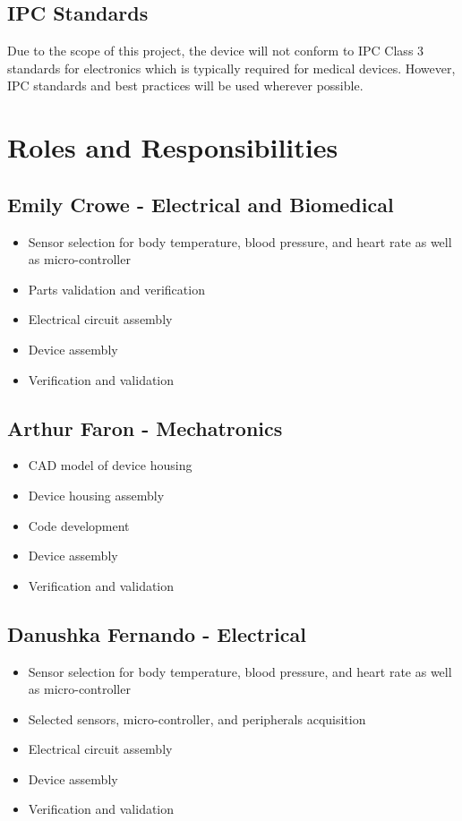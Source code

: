 \documentclass{article}
\begin{document}
    \subsection{IPC Standards}
    Due to the scope of this project, the device will not conform to IPC Class 3 standards for electronics which is typically required for medical devices.  However, IPC standards and best practices will be used wherever possible.  
    
    
    \newpage
    
    \section{Roles and Responsibilities}
        \subsection{Emily Crowe - Electrical and Biomedical}
            \begin{itemize}
                \item Sensor selection for body temperature, blood pressure, and heart rate as well as micro-controller
                \item Parts validation and verification
                \item Electrical circuit assembly
                \item Device assembly
                \item Verification and validation
            \end{itemize}
        \subsection{Arthur Faron - Mechatronics}
            \begin{itemize}
                \item CAD model of device housing
                \item Device housing assembly
                \item Code development
                \item Device assembly
                \item Verification and validation
            \end{itemize}
        \subsection{Danushka Fernando - Electrical}
            \begin{itemize}
                \item Sensor selection for body temperature, blood pressure, and heart rate as well as micro-controller
                \item Selected sensors, micro-controller, and peripherals acquisition
                \item Electrical circuit assembly
                \item Device assembly
                \item Verification and validation
            \end{itemize}
\end{document}
